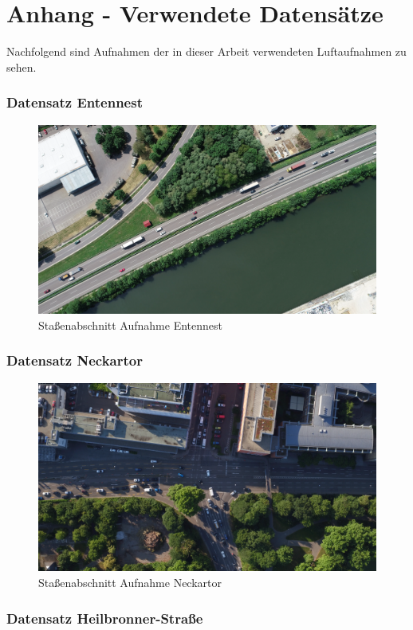 
\chapter{Anhang - Verwendete Datensätze}
\label{cha:anhang_a}

Nachfolgend sind Aufnahmen der in dieser Arbeit verwendeten Luftaufnahmen zu sehen.

\subsection*{Datensatz Entennest}

\begin{figure}[H]
\centering
    \includegraphics[width=0.6\linewidth]{resources/img/Anhang/Entennest}
\caption[]{Staßenabschnitt Aufnahme Entennest}
\label{fig:anhang_ds_entennest}
\end{figure}

\subsection*{Datensatz Neckartor}

\begin{figure}[H]
\centering
    \includegraphics[width=0.6\linewidth]{resources/img/Anhang/Neckartor}
\caption[]{Staßenabschnitt Aufnahme Neckartor}
\label{fig:anhang_ds_neckartor}
\end{figure}

\subsection*{Datensatz Heilbronner-Straße}

